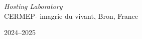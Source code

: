 \documentclass[a4paper,12pt,twoside,english,openany]{book}
\begin{document}
\begin{titlepage}
\begin{center}
		{\normalsize \textit{Hosting Laboratory}}\\
		{\normalsize CERMEP- imagrie du vivant, Bron, France}

		\vfill

		{\large 2024--2025}
	\end{center}

	\vspace{1cm}
\end{titlepage}

\renewcommand{\chaptermark}[1]{\markboth{#1}{}}


\frontmatter

\tableofcontents

\mainmatter
\setlength{\parskip}{.7em}

\renewcommand{\baselinestretch}{1.1}


\fancyhead[]{}
\fancyfoot[]{}
\fancyhead[LH]{\leftmark}
\fancyhead[RH]{\thepage}







\newpage
\fancyhead{}
\printbibliography[
	heading=bibintoc,
	title={References}]
\end{document}
